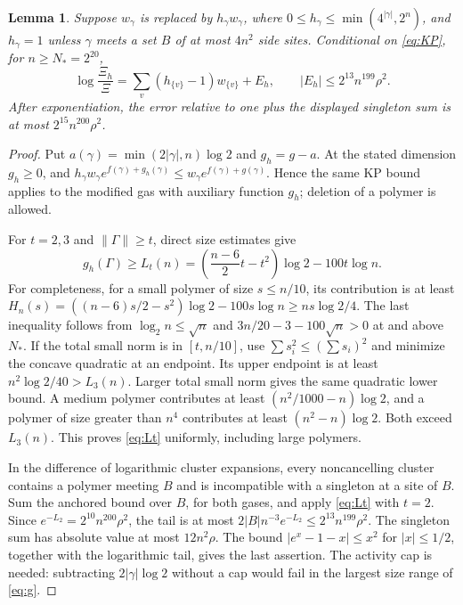 \documentclass[11pt]{article}
\newtheorem{lemma}[theorem]{Lemma}
\theoremstyle{remark}\newtheorem{remark}[theorem]{Remark}
\newcommand{\norm}[1]{\lVert#1\rVert}
\begin{document}
\begin{lemma}\label{lem:local}
Suppose $w_\gamma$ is replaced by $h_\gamma w_\gamma$, where
$0\le h_\gamma\le\min(4^{|\gamma|},2^n)$, and $h_\gamma=1$ unless
$\gamma$ meets a set $B$ of at most $4n^2$ side sites. Conditional on
\eqref{eq:KP}, for $n\ge N_*=2^{20}$,
\begin{equation}\label{eq:local}
 \log\frac{\Xi_h}{\Xi}
 =\sum_v(h_{\{v\}}-1)w_{\{v\}}+E_h,
 \qquad |E_h|\le2^{13}n^{199}\rho^2.
\end{equation}
After exponentiation, the error relative to one plus the displayed
singleton sum is at most $2^{15}n^{200}\rho^2$.
\end{lemma}
\begin{proof}
Put $a(\gamma)=\min(2|\gamma|,n)\log2$ and $g_h=g-a$.
At the stated dimension $g_h\ge0$, and
$h_\gamma w_\gamma e^{f(\gamma)+g_h(\gamma)}
\le w_\gamma e^{f(\gamma)+g(\gamma)}$. Hence the same KP bound applies
to the modified gas with auxiliary function $g_h$; deletion of a polymer
is allowed.

For $t=2,3$ and $\norm\Gamma\ge t$, direct size estimates give
\begin{equation}\label{eq:Lt}
 g_h(\Gamma)\ge L_t(n)
 =\left(\frac{n-6}{2}t-t^2\right)\log2-100t\log n.
\end{equation}
For completeness, for a small polymer of size $s\le n/10$, its
contribution is at least
$H_n(s)=((n-6)s/2-s^2)\log2-100s\log n\ge ns\log2/4$.
The last inequality follows from $\log_2n\le\sqrt n$ and
$3n/20-3-100\sqrt n>0$ at and above $N_*$. If the total small norm
is in $[t,n/10]$, use $\sum s_i^2\le(\sum s_i)^2$ and minimize the
concave quadratic at an endpoint. Its upper endpoint is at least
$n^2\log2/40>L_3(n)$. Larger total small norm gives the same quadratic
lower bound. A medium polymer contributes at least
$(n^2/1000-n)\log2$, and a polymer of size greater than $n^4$
contributes at least $(n^2-n)\log2$. Both exceed $L_3(n)$.
This proves \eqref{eq:Lt} uniformly, including large polymers.

In the difference of logarithmic cluster expansions, every noncancelling
cluster contains a polymer meeting $B$ and is incompatible with a
singleton at a site of $B$. Sum the anchored bound over $B$, for both
gases, and apply \eqref{eq:Lt} with $t=2$. Since
$e^{-L_2}=2^{10}n^{200}\rho^2$, the tail is at most
$2|B|n^{-3}e^{-L_2}\le2^{13}n^{199}\rho^2$.
The singleton sum has absolute value at most $12n^2\rho$.
The bound $|e^x-1-x|\le x^2$ for $|x|\le1/2$, together with the
logarithmic tail, gives the last assertion. The activity cap is needed:
subtracting $2|\gamma|\log2$ without a cap would fail in the largest
size range of \eqref{eq:g}.
\end{proof}
\end{document}
